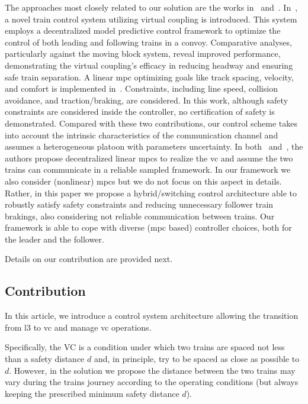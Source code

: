 \documentclass[letterpaper, 10 pt, conference]{ieeeconf}
\theoremstyle{definition}
\theoremstyle{nopoint}
\newcommand{\red}[1]{%
	{\color{red}{#1}}%
}
\begin{document}
\red{ADD ROBUSTEZZA AND COMUNICAZIONE ENFATIZZAZ RISPETTO AI PAPER CITATI}
The approaches most closely related to our solution are the works in~\cite{felez2019model} and~\cite{wu2021virtually}. In~\cite{felez2019model}, a novel train control system utilizing virtual coupling is introduced. This system employs a decentralized model predictive control framework to optimize the control of both leading and following trains in a convoy. Comparative analyses, particularly against the moving block system, reveal improved performance, demonstrating the virtual coupling's efficacy in reducing headway and ensuring safe train separation. A linear \gls{mpc} optimizing goals like track spacing, velocity, and comfort is implemented in~\cite{wu2021virtually}. Constraints, including line speed, collision avoidance, and traction/braking, are considered. In this work, although  safety constraints are considered inside the controller, no certification of safety is demonstrated. Compared with these two contributions, our control scheme takes into account the intrinsic characteristics of the communication channel and assumes a heterogeneous platoon with parameters uncertainty. In both~\cite{felez2019model} and~\cite{wu2021virtually}, the authors propose decentralized linear \glspl{mpc} to realize the \gls{vc} and assume the two trains can communicate in a reliable sampled framework.
In our framework we also consider (nonlinear) \glspl{mpc} but we do not focus on this aspect in details. 
Rather, in this paper we propose a hybrid/switching control architecture able to robustly satisfy safety constraints and reducing unnecessary follower train brakings, also considering not reliable communication between trains. Our framework is able to cope with diverse (\gls{mpc} based) controller choices, both for the leader and the follower. 

Details on our contribution are provided next.


\subsection{Contribution}
\label{subsec:contribution}
%

In this article, we introduce a control system architecture
allowing the transition from \gls{l3} to \gls{vc} and manage \gls{vc} operations. 

Specifically, the VC is a condition under which two trains are spaced not less than a safety distance $d$ and, in principle, try to be spaced as close as possible to $d$. 
However, in the solution we propose the distance between the two trains may vary during the trains journey according to the operating conditions (but always keeping the prescribed minimum safety distance $d$).
\end{document}
